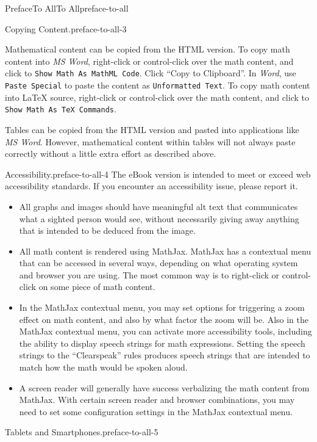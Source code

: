 \documentclass[twoside,10pt,]{book}
\newcommand{\mono}[1]{\texttt{#1}}
\newcommand{\pubtitle}[1]{\textsl{#1}}
\numberwithin{equation}{section}
\begin{document}
\begin{preface}{Preface}{To All}{}{To All}{}{}{preface-to-all}
\begin{paragraphs}{Copying Content.}{preface-to-all-3}
\par
Mathematical content can be copied from the HTML version. To copy math content into \pubtitle{MS Word}, right-click or control-click over the math content, and click to \mono{Show Math As MathML Code}. Click ``Copy to Clipboard''. In \pubtitle{Word}, use \mono{Paste Special} to paste the content as \mono{Unformatted Text}. To copy math content into \LaTeX{} source, right-click or control-click over the math content, and click to \mono{Show Math As TeX Commands}.%
\par
Tables can be copied from the HTML version and pasted into applications like \pubtitle{MS Word}. However, mathematical content within tables will not always paste correctly without a little extra effort as described above.%
\end{paragraphs}%
\begin{paragraphs}{Accessibility.}{preface-to-all-4}%
The eBook version is intended to meet or exceed web accessibility standards. If you encounter an accessibility issue, please report it.%
\begin{itemize}[label=\textbullet]
\item{}All graphs and images should have meaningful alt text that communicates what a sighted person would see, without necessarily giving away anything that is intended to be deduced from the image.%
\item{}All math content is rendered using MathJax. MathJax has a contextual menu that can be accessed in several ways, depending on what operating system and browser you are using. The most common way is to right-click or control-click on some piece of math content.%
\item{}In the MathJax contextual menu, you may set options for triggering a zoom effect on math content, and also by what factor the zoom will be. Also in the MathJax contextual menu, you can activate more accessibility tools, including the ability to display speech strings for math expressions. Setting the speech strings to the ``Clearspeak'' rules produces speech strings that are intended to match how the math would be spoken aloud.%
\item{}A screen reader will generally have success verbalizing the math content from MathJax. With certain screen reader and browser combinations, you may need to set some configuration settings in the MathJax contextual menu.%
\end{itemize}
%
\end{paragraphs}%
\begin{paragraphs}{Tablets and Smartphones.}{preface-to-all-5}%

\end{paragraphs}
\end{preface}
\end{document}
